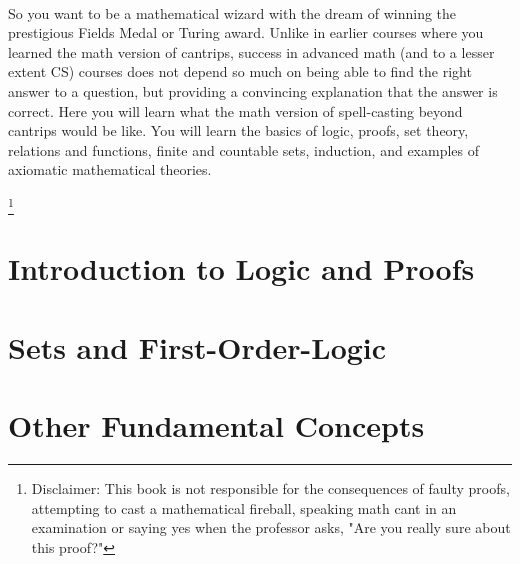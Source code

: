 \documentclass[letterpaper,10pt,twoside,onecolumn,openany]{book}
\begin{document}
\frontmatter                           
\begin{titlepage}
    ~
    
    \newpage
    
    \begin{center}
        

        \large
        \vspace*{\fill}
        So you want to be a mathematical wizard with the dream of winning the prestigious Fields Medal or Turing award. Unlike in earlier courses where you learned the math version of cantrips, success in advanced math (and to a lesser extent CS) courses does not depend so much on being able to find the right answer to a question, but providing a convincing explanation that the answer is correct. Here you will learn what the math version of spell-casting beyond cantrips would be like. You will learn the basics of logic, proofs, set theory, relations and functions, finite and countable sets, induction, and examples of axiomatic mathematical theories.
        \vspace*{\fill}

    \end{center}
    \let\thefootnote\relax\footnote{Disclaimer: This book is not responsible for the consequences of faulty proofs, attempting to cast a mathematical fireball, speaking math cant in an examination or saying yes when the professor asks, "Are you really sure about this proof?" }
\end{titlepage}

\tableofcontents
\mainmatter
\part{Introduction to Logic and Proofs}


\part{Sets and First-Order-Logic}



\part{Other Fundamental Concepts}




\end{document}
